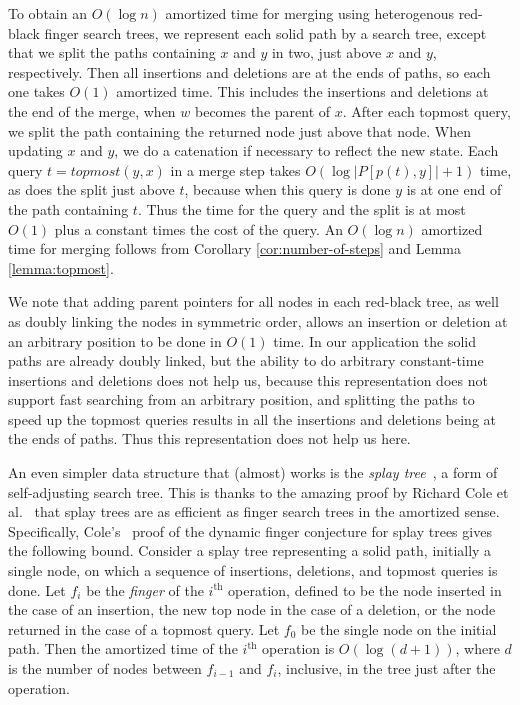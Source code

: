 \documentclass[twoside,leqno,twocolumn]{article}
\begin{document}
To obtain an $O(\log n)$ amortized time for merging using heterogenous red-black finger search trees, we represent each solid path by a search tree, except that we split the paths containing $x$ and $y$ in two, just above $x$ and $y$, respectively.  Then all insertions and deletions are at the ends of paths, so each one takes $O(1)$ amortized time. This includes the insertions and deletions at the end of the merge, when $w$ becomes the parent of $x$. After each topmost query, we split the path containing the returned node just above that node.  When updating $x$ and $y$, we do a catenation if necessary to reflect the new state.  Each query $t = \mathit{topmost}(y, x)$ in a merge step takes $O(\log|P[p(t), y]|+1)$ time, as does the split just above $t$, because when this query is done $y$ is at one end of the path containing $t$. Thus the time for the query and the split is at most $O(1)$ plus a constant times the cost of the query. An $O(\log n)$ amortized time for merging follows from Corollary \ref{cor:number-of-steps} and Lemma \ref{lemma:topmost}.

We note that adding parent pointers for all nodes in each red-black tree, as well as doubly linking the nodes in symmetric order, allows an insertion or deletion at an arbitrary position to be done in $O(1)$ time.  In our application the solid paths are already doubly linked, but the ability to do arbitrary constant-time insertions and deletions does not help us, because this representation does not support fast searching from an arbitrary position, and splitting the paths to speed up the topmost queries results in all the insertions and deletions being at the ends of paths.  Thus this representation does not help us here. 

An even simpler data structure that (almost) works is the \emph{splay tree}~\cite{ST85}, a form of self-adjusting search tree.  This is thanks to the amazing proof by Richard Cole et al.~\cite{dynamic_finger:c00,dynamic_finger:cmss00} that splay trees are as efficient as finger search trees in the amortized sense.  Specifically, Cole's~\cite{dynamic_finger:c00} proof of the dynamic finger conjecture for splay trees gives the following bound.  Consider a splay tree representing a solid path, initially a single node, on which a sequence of insertions, deletions, and topmost queries is done.  Let $f_i$ be the \emph{finger} of the $i^{\mathrm{th}}$ operation, defined to be the node inserted in the case of an insertion, the new top node in the case of a deletion, or the node returned in the case of a topmost query.  Let $f_0$ be the single node on the initial path.  Then the amortized time of the $i^{\mathrm{th}}$ operation is $O(\log(d + 1))$, where $d$ is the number of nodes between $f_{i - 1}$ and $f_i$, inclusive, in the tree just after the operation.
\end{document}
